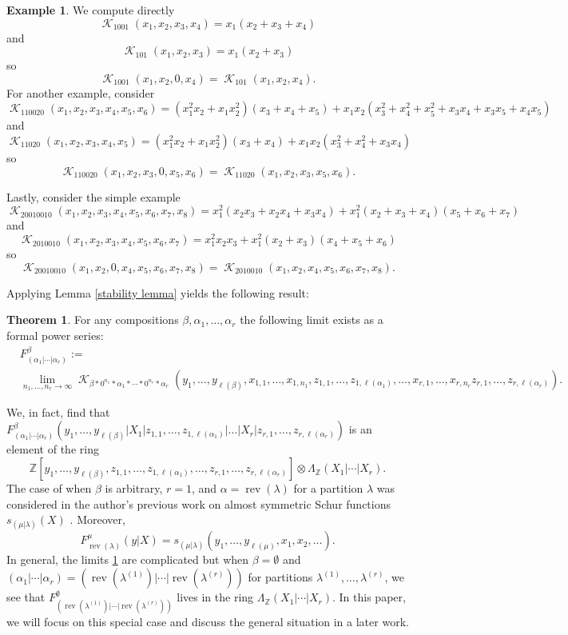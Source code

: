 \documentclass[12pt,reqno]{amsart}
\theoremstyle{definition}
\newtheorem{thm}{Theorem}[section]
\newtheorem{example}{Example}
\DeclareMathOperator{\rev}{rev}
\DeclareMathOperator{\cK}{\mathcal{K}}
\begin{document}
\begin{example}
    We compute directly
    $$\cK_{1001}(x_1,x_2,x_3,x_4) = x_1(x_2+x_3+x_4)$$ and 
    $$\cK_{101}(x_1,x_2,x_3) = x_1(x_2+x_3)$$ so 
    $$\cK_{1001}(x_1,x_2,0,x_4) = \cK_{101}(x_1,x_2,x_4).$$ For another example, consider  
    $$\cK_{110020}(x_1,x_2,x_3,x_4,x_5,x_6) = (x_1^2x_2+x_1x_2^2)(x_3+x_4+x_5) + x_1x_2(x_3^2+x_4^2+x_5^2 + x_3x_4+x_3x_5+x_4x_5)$$ and
    $$\cK_{11020}(x_1,x_2,x_3,x_4,x_5) = (x_1^2x_2+x_1x_2^2)(x_3+x_4) + x_1x_2(x_3^2+x_4^2+ x_3x_4)$$ so 
    $$\cK_{110020}(x_1,x_2,x_3,0,x_5,x_6) = \cK_{11020}(x_1,x_2,x_3,x_5,x_6).$$

    Lastly, consider the simple example 
    $$\cK_{20010010}(x_1,x_2,x_3,x_4,x_5,x_6,x_7,x_8) = x_1^2(x_2x_3+x_2x_4+x_3x_4)+x_1^2(x_2+x_3+x_4)(x_5+x_6+x_7)$$ and 
    $$\cK_{2010010}(x_1,x_2,x_3,x_4,x_5,x_6,x_7) = x_1^2x_2x_3 + x_1^2(x_2+x_3)(x_4+x_5+x_6)$$ so 
    $$\cK_{20010010}(x_1,x_2,0,x_4,x_5,x_6,x_7,x_8) =\cK_{2010010}(x_1,x_2,x_4,x_5,x_6,x_7,x_8).$$
\end{example}

Applying Lemma \ref{stability lemma} yields the following result:


\begin{thm}\label{general key stability thm}
    For any compositions $\beta,\alpha_1,\ldots,\alpha_r$ the following limit exists as a formal power series:
    \begin{align*}
        &F_{(\alpha_1|\cdots |\alpha_r)}^{\beta} :=\\
        &\lim_{n_1,\ldots , n_r \rightarrow \infty}\cK_{\beta*0^{n_1}*\alpha_1*\cdots * 0^{n_r}*\alpha_r}(y_1,\ldots,y_{\ell(\beta)}, x_{1,1},\ldots,x_{1,n_{1}},z_{1,1},\ldots,z_{1,\ell(\alpha_1)},\ldots, x_{r,1},\ldots,x_{r,n_r}z_{r,1},\ldots,z_{r,\ell(\alpha_r)}).
    \end{align*}

\end{thm}

We, in fact, find that 
$F_{(\alpha_1|\cdots |\alpha_r)}^{\beta}(y_1,\ldots,y_{\ell(\beta)}|X_1 |z_{1,1},\ldots,z_{1,\ell(\alpha_1)}|\ldots|X_r|z_{r,1},\ldots,z_{r,\ell(\alpha_r)})$ is an element of the ring 
$$\mathbb{Z}[y_1,\ldots,y_{\ell(\beta)},z_{1,1},\ldots,z_{1,\ell(\alpha_1)},\ldots,z_{r,1},\ldots,z_{r,\ell(\alpha_r)}]\otimes \Lambda_{\mathbb{Z}}(X_1|\cdots|X_r).$$ The case of when $\beta$ is arbitrary, $r=1$, and $\alpha = \rev(\lambda)$ for a partition $\lambda$ was considered in the author's previous work on almost symmetric Schur functions $s_{(\mu|\lambda)}(X)$ \cite{BWAlmostSymSchur}. Moreover, 
$$F^{\mu}_{\rev(\lambda)}(y|X) = s_{(\mu|\lambda)}(y_1,\ldots,y_{\ell(\mu)},x_1,x_2,\ldots).$$ In general, the limits \ref{general key stability thm} are complicated but when $\beta = \emptyset$ and $(\alpha_1  |\cdots |\alpha_r)=(\rev(\lambda^{(1)})|\cdots | \rev(\lambda^{(r)}))$ for partitions $\lambda^{(1)},\ldots,\lambda^{(r)}$, we see that
$F_{(\rev(\lambda^{(1)})|\cdots | \rev(\lambda^{(r)}))}^{\emptyset}$ lives in the ring 
$\Lambda_{\mathbb{Z}}(X_1|\cdots|X_r).$ In this paper, we will focus on this special case and discuss the general situation in a later work.
\end{document}

